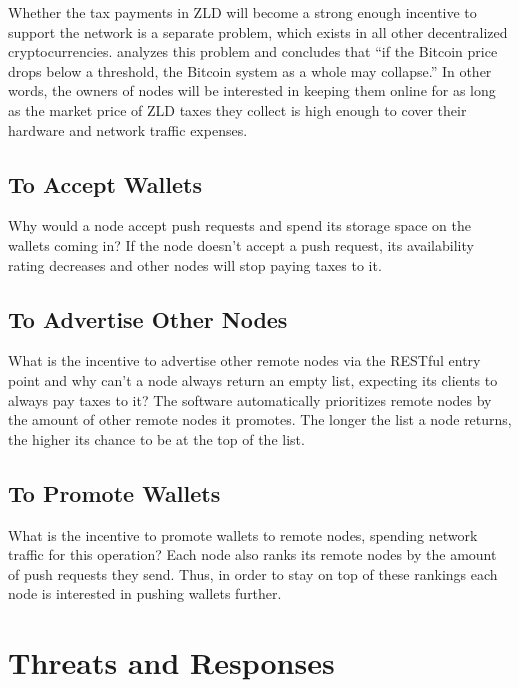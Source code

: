 \documentclass{main}
\begin{document}
Whether the tax payments in ZLD will become a strong enough incentive
to support the network is a separate problem, which exists in all
other decentralized cryptocurrencies. \textcite{iwamura2014} analyzes this
problem and concludes that ``if the Bitcoin price drops below
a threshold, the Bitcoin system as a whole may collapse.'' In other words,
the owners of nodes will be interested in keeping them online for as long
as the market price of ZLD taxes they collect is high enough to cover
their hardware and network traffic expenses.

\subsection{To Accept Wallets}

Why would a node accept push requests and spend its storage space
on the wallets coming in? If the node doesn't accept a push request,
its availability rating decreases and other nodes will stop paying
taxes to it.

\subsection{To Advertise Other Nodes}

What is the incentive to advertise other remote nodes via the  RESTful
entry point and why can't a node always return an empty list, expecting its clients
to always pay taxes to it? The software automatically prioritizes remote
nodes by the amount of other remote nodes it promotes. The longer the list a node
returns, the higher its chance to be at the top of the list.

\subsection{To Promote Wallets}

What is the incentive to promote wallets to remote nodes, spending network
traffic for this operation? Each node also ranks its remote nodes by the
amount of push requests they send. Thus, in order to stay on top of these rankings
each node is interested in pushing wallets further.


\section{Threats and Responses}\label{sec:threats}
\end{document}
